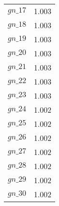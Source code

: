 \begin{center}
\begin{longtable}{cc}
$gn\_17$ 	 & 	 1.003 \\
$gn\_18$ 	 & 	 1.003 \\
$gn\_19$ 	 & 	 1.003 \\
$gn\_20$ 	 & 	 1.003 \\
$gn\_21$ 	 & 	 1.003 \\
$gn\_22$ 	 & 	 1.003 \\
$gn\_23$ 	 & 	 1.003 \\
$gn\_24$ 	 & 	 1.002 \\
$gn\_25$ 	 & 	 1.002 \\
$gn\_26$ 	 & 	 1.002 \\
$gn\_27$ 	 & 	 1.002 \\
$gn\_28$ 	 & 	 1.002 \\
$gn\_29$ 	 & 	 1.002 \\
$gn\_30$ 	 & 	 1.002 \\
\bottomrule%
\end{longtable}
\end{center}
